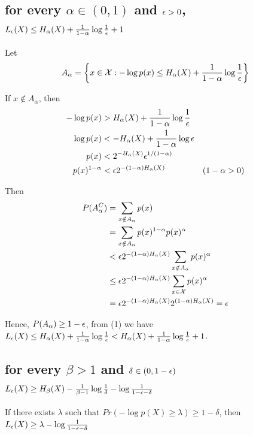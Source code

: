 \documentclass{article}
\begin{document}
\subsection{for every $\alpha \in (0, 1)$ and $\eps > 0$, $L_\eps(X) \leq H_\alpha(X) + \frac{1}{1-\alpha} \log \frac{1}{\eps} + 1$}

Let 
$$
    A_\alpha = \set*{x \in \mathcal{X}: - \log p(x) \leq H_\alpha(X) + \frac{1}{1-\alpha} \log \frac{1}{\eps}}
$$

If $x \notin A_\alpha$, then 
\begin{align*}
    - \log p(x) &> H_\alpha(X) + \frac{1}{1-\alpha} \log \frac{1}{\eps} \\
    \log p(x) &< -H_\alpha(X) + \frac{1}{1-\alpha} \log \eps \\
    p(x) &< 2^{-H_\alpha(X)} \eps^{1/(1-\alpha)} \\
    p(x)^{1 - \alpha} &< \eps 2^{-(1-\alpha) H_\alpha(X)} &\text{($1 - \alpha > 0$)}
\end{align*}

Then
\begin{align*}
    P(A_\alpha^C)
    &= \sum_{x \notin A_\alpha} p(x) \\
    &= \sum_{x \notin A_\alpha} p(x)^{1-\alpha} p(x)^\alpha \\
    &< \eps 2^{-(1-\alpha) H_\alpha(X)} \sum_{x \notin A_\alpha} p(x)^\alpha  \\
    &\leq \eps 2^{-(1-\alpha) H_\alpha(X)} \sum_{x \in \mathcal{X}} p(x)^\alpha \\
    &= \eps 2^{-(1-\alpha) H_\alpha(X)} 2^{(1-\alpha) H_\alpha(X)} = \eps\\
\end{align*}

Hence, $P(A_\alpha) \geq 1 - \eps$, from (1) we have $L_\eps(X) \leq H_\alpha(X) + \frac{1}{1-\alpha} \log \frac{1}{\eps} < H_\alpha(X) + \frac{1}{1-\alpha} \log \frac{1}{\eps} + 1$.
\subsection{for every $\beta > 1$ and $\delta \in (0, 1-\eps)$
$
    L_\eps(X) \geq H_\beta(X) - \frac{1}{\beta-1} \log \frac{1}{\delta} - \log \frac{1}{1-\eps-\delta}
$}

\begin{lemma}
    \label{lemma3}
    If there exists $\lambda$ such that $Pr(- \log p(X) \geq \lambda) \geq 1 - \delta$, then $L_\eps(X) \geq \lambda - \log \frac{1}{1 - \eps - \delta}$
\end{lemma}
\end{document}
